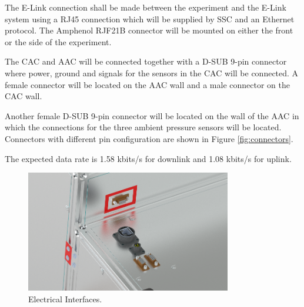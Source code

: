 The E-Link connection shall be made between the experiment and the E-Link system using a RJ45 connection which will be supplied by SSC and an Ethernet protocol. The Amphenol RJF21B connector will be mounted on either the front or the side of the experiment\cite{BexusManual}.  

The CAC and AAC will be connected together with a D-SUB 9-pin connector where power, ground and signals for the sensors in the CAC will be connected. A female connector will be located on the AAC wall and a male connector on the CAC wall.

Another female D-SUB 9-pin connector will be located on the wall of the AAC in which the connections for the three ambient pressure sensors will be located. Connectors with different pin configuration are shown in Figure \ref{fig:connectors}.

The expected data rate is 1.58 kbits/s for downlink and 1.08 kbits/s for uplink.

\begin{figure}[H]
    \centering
    \includegraphics[width=0.8\textwidth]{4-experiment-design/img/Mechanical/Figure_Detail_Interfaces.png}
    \caption{Electrical Interfaces.}
    \label{fig:electrical_interfaces}
\end{figure}

\raggedbottom